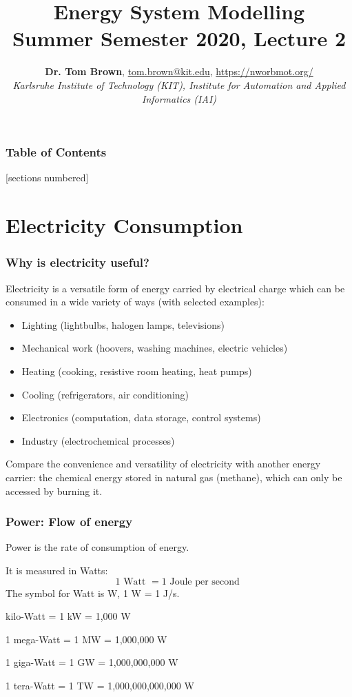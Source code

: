 \documentclass[10pt,aspectratio=169,dvipsnames]{beamer}
\title{Energy System Modelling\\ Summer Semester 2020, Lecture 2}
\author{
  {\bf Dr. Tom Brown}, \href{mailto:tom.brown@kit.edu}{tom.brown@kit.edu}, \url{https://nworbmot.org/}\\
  \emph{Karlsruhe Institute of Technology (KIT), Institute for Automation and Applied Informatics (IAI)}
}
\date{}
\let\olditem\item
\renewcommand{\item}{%
\olditem\vspace{5pt}}
\begin{document}
\maketitle


\begin{frame}

  \frametitle{Table of Contents}
  [sections numbered]
  \tableofcontents[hideallsubsections]
\end{frame}



\section{Electricity Consumption}

\begin{frame}
  \frametitle{Why is electricity useful?}

  Electricity is a versatile form of energy carried by electrical
  charge which can be consumed in a wide variety of ways (with selected examples):
  \begin{itemize}
  \item Lighting (lightbulbs, halogen lamps, televisions)
  \item Mechanical work (hoovers, washing machines, electric vehicles)
  \item Heating (cooking, resistive room heating, heat pumps)
  \item Cooling (refrigerators, air conditioning)
  \item Electronics (computation, data storage, control systems)
  \item Industry (electrochemical processes)
  \end{itemize}

  Compare the convenience and versatility of electricity with another
  energy carrier: the chemical energy stored in natural gas (methane),
  which can only be accessed by burning it.

\end{frame}



\begin{frame}
  \frametitle{Power: Flow of energy}

  \alert{Power} is the rate of consumption of energy.

  It is measured in \alert{Watts}:
  \begin{equation*}
     1 \textrm{ Watt } = 1 \textrm{ Joule per second }
  \end{equation*}
  The symbol for Watt is W, 1 W = 1 J/s.

   kilo-Watt = 1 kW = 1,000 W

  1 mega-Watt = 1 MW = 1,000,000 W

  1 giga-Watt = 1 GW = 1,000,000,000 W

  1 tera-Watt = 1 TW = 1,000,000,000,000 W


\end{frame}
\end{document}
